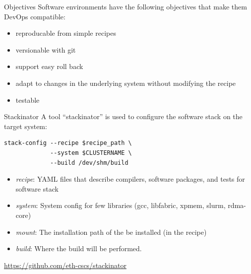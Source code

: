 \documentclass[aspectratio=43]{beamer}
\begin{document}
\begin{frame}[fragile]{Objectives}
    Software environments have the following objectives that make them DevOps compatible:
    \begin{itemize}
        \item reproducable from simple recipes
        \item versionable with git
        \item support easy roll back
        \item adapt to changes in the underlying system without modifying the recipe
        \item testable
    \end{itemize}
\end{frame}


\begin{frame}[fragile]{Stackinator}
    A tool ``stackinator'' is used to configure the software stack on the target system:

            \begin{lstlisting}[style=talkbash]
            stack-config --recipe $recipe_path \
             --system $CLUSTERNAME \
             --build /dev/shm/build
            \end{lstlisting}

    \begin{itemize}
        \item \emph{recipe}: YAML files that describe compilers, software packages, and tests for software stack
        \item \emph{system}: System config for few libraries (gcc, libfabric, xpmem, slurm, rdma-core)
        \item \emph{mount}: The installation path of the be installed (in the recipe)
        \item \emph{build}: Where the build will be performed.
    \end{itemize}

    \url{https://github.com/eth-cscs/stackinator}
\end{frame}
\end{document}
